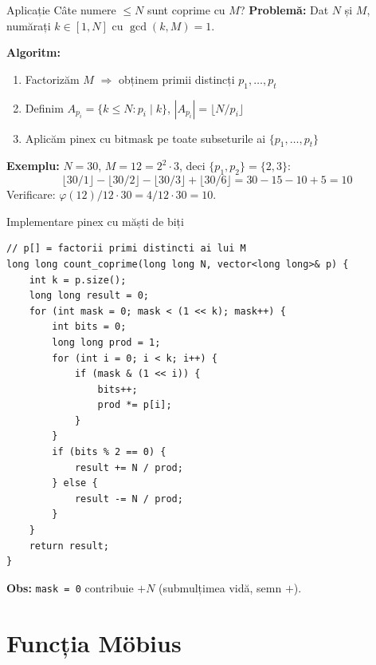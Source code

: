 \documentclass[10pt]{beamer}
\begin{document}
\begin{frame}{Aplicație \textemdash{} Câte numere $\leq N$ sunt coprime cu $M$?}
  \textbf{Problemă:} Dat $N$ și $M$, numărați $k \in [1, N]$ cu $\gcd(k, M) = 1$.

  \textbf{Algoritm:}
  \begin{enumerate}\itemsep2pt
    \item Factorizăm $M$ $\Rightarrow$ obținem primii distincți $p_1, \ldots, p_t$
    \item Definim $A_{p_i} = \{k \leq N : p_i \mid k\}$, $|A_{p_i}| = \lfloor N/p_i \rfloor$
    \item Aplicăm pinex cu bitmask pe toate subseturile ai $\{p_1, \ldots, p_t\}$
  \end{enumerate}
  \smallskip
  \textbf{Exemplu:} $N = 30$, $M = 12 = 2^2 \cdot 3$, deci $\{p_1, p_2\} = \{2, 3\}$:
  \[
    \lfloor 30/1 \rfloor - \lfloor 30/2 \rfloor - \lfloor 30/3 \rfloor + \lfloor 30/6 \rfloor
    = 30 - 15 - 10 + 5 = 10
  \]
  Verificare: $\varphi(12)/12 \cdot 30 = 4/12 \cdot 30 = 10$. \checkmark
\end{frame}

\begin{frame}[fragile]{Implementare pinex cu măști de biți}
  \begin{lstlisting}
// p[] = factorii primi distincti ai lui M
long long count_coprime(long long N, vector<long long>& p) {
    int k = p.size();
    long long result = 0;
    for (int mask = 0; mask < (1 << k); mask++) {
        int bits = 0;
        long long prod = 1;
        for (int i = 0; i < k; i++) {
            if (mask & (1 << i)) {
                bits++;
                prod *= p[i];
            }
        }
        if (bits % 2 == 0) {
            result += N / prod;
        } else {
            result -= N / prod;
        }
    }
    return result;
}
  \end{lstlisting}
  \textbf{Obs:} \texttt{mask = 0} contribuie $+N$ (submulțimea vidă, semn $+$).
\end{frame}


\section{Funcția Möbius}
\end{document}
